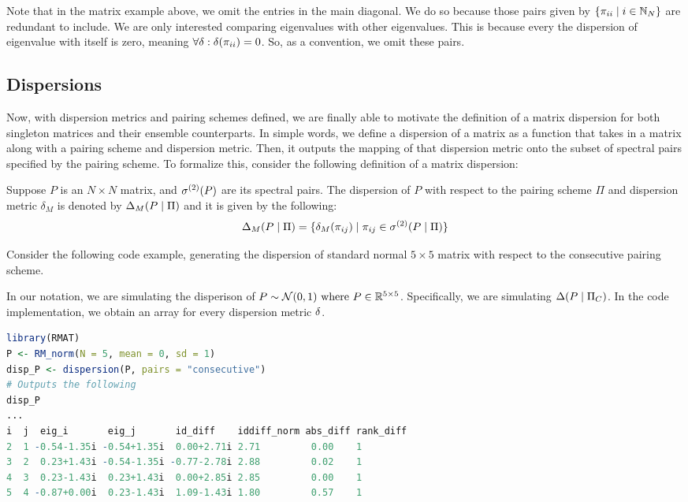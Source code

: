 \begin{remark}
Note that in the matrix example above, we omit the entries in the main diagonal. We do so because those pairs given by $\{\pi_{ii} \mid i \in \mathbb{N}_N\}$
are redundant to include. We are only interested comparing eigenvalues with other eigenvalues. This is because every the dispersion of eigenvalue with itself is zero,
meaning $\forall \delta : \delta(\pi_{ii}) = 0$. So, as a convention, we omit these pairs.
\end{remark}

\newpage
\subsection{Dispersions}

Now, with dispersion metrics and pairing schemes defined, we are finally able to motivate the definition of a matrix dispersion for both singleton matrices and their ensemble counterparts.
In simple words, we define a dispersion of a matrix as a function that takes in a matrix along with a pairing scheme and dispersion metric.
Then, it outputs the mapping of that dispersion metric onto the subset of spectral pairs specified by the pairing scheme.
To formalize this, consider the following definition of a matrix dispersion:

\begin{definition}[Dispersion]
Suppose $P$ is an $N \times N$ matrix, and ${\sigma^{(2)}}(P)$ are its spectral pairs.
The dispersion of $P$ with respect to the pairing scheme $\Pi$ and dispersion metric $\delta_M$ is denoted by $\Delta_M(P \mid \Pi)$ and it is given by the following:
$$\Delta_M(P \mid \Pi) = \{\delta_M({\pi_{ij}}) \mid {\pi_{ij}} \in {\sigma^{(2)}}(P \mid \Pi)\}$$
\end{definition}

Consider the following code example, generating the dispersion of standard normal $5 \times 5$ matrix with respect to the consecutive pairing scheme.

\begin{code}
In our notation, we are simulating the disperison of $P \sim \mathcal{N}(0,1) \text{ where } P \in \mathbb{R}^{5 \times 5}$.
Specifically, we are simulating $\Delta(P \mid \Pi_C)$. In the code implementation, we obtain an array for every dispersion metric $\delta$.
\end{code}
\begin{lstlisting}[language=R]
library(RMAT)
P <- RM_norm(N = 5, mean = 0, sd = 1)
disp_P <- dispersion(P, pairs = "consecutive")
# Outputs the following
disp_P
...
i  j  eig_i       eig_j       id_diff    iddiff_norm abs_diff rank_diff
2  1 -0.54-1.35i -0.54+1.35i  0.00+2.71i 2.71         0.00    1
3  2  0.23+1.43i -0.54-1.35i -0.77-2.78i 2.88         0.02    1
4  3  0.23-1.43i  0.23+1.43i  0.00+2.85i 2.85         0.00    1
5  4 -0.87+0.00i  0.23-1.43i  1.09-1.43i 1.80         0.57    1
\end{lstlisting}

